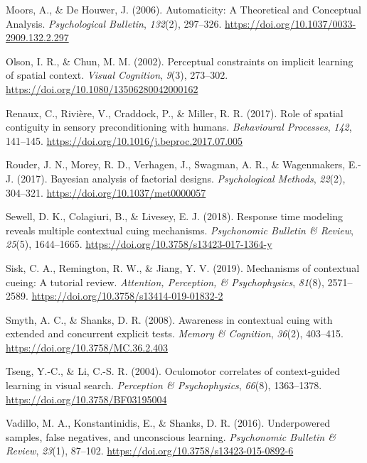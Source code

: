 \documentclass[
  man,
  floatsintext,
  longtable,
  nolmodern,
  notxfonts,
  notimes,
  colorlinks=true,linkcolor=blue,citecolor=blue,urlcolor=blue]{apa7}
\newlength{\cslhangindent}
\newenvironment{CSLReferences}[2] %
 {\begin{list}{}{%
  \setlength{\itemindent}{0pt}
  \setlength{\leftmargin}{0pt}
  \setlength{\parsep}{0pt}
  \ifodd #1
   \setlength{\leftmargin}{\cslhangindent}
   \setlength{\itemindent}{-1\cslhangindent}
  \fi
  \setlength{\itemsep}{#2\baselineskip}}}
 {\end{list}}
\begin{document}
\begin{CSLReferences}{1}{0}
Moors, A., \& De Houwer, J. (2006). Automaticity: {A Theoretical} and
{Conceptual Analysis}. \emph{Psychological Bulletin}, \emph{132}(2),
297--326. \url{https://doi.org/10.1037/0033-2909.132.2.297}

Olson, I. R., \& Chun, M. M. (2002). Perceptual constraints on implicit
learning of spatial context. \emph{Visual Cognition}, \emph{9}(3),
273--302. \url{https://doi.org/10.1080/13506280042000162}

Renaux, C., Rivière, V., Craddock, P., \& Miller, R. R. (2017). Role of
spatial contiguity in sensory preconditioning with humans.
\emph{Behavioural Processes}, \emph{142}, 141--145.
\url{https://doi.org/10.1016/j.beproc.2017.07.005}

Rouder, J. N., Morey, R. D., Verhagen, J., Swagman, A. R., \&
Wagenmakers, E.-J. (2017). Bayesian analysis of factorial designs.
\emph{Psychological Methods}, \emph{22}(2), 304--321.
\url{https://doi.org/10.1037/met0000057}

Sewell, D. K., Colagiuri, B., \& Livesey, E. J. (2018). Response time
modeling reveals multiple contextual cuing mechanisms. \emph{Psychonomic
Bulletin \& Review}, \emph{25}(5), 1644--1665.
\url{https://doi.org/10.3758/s13423-017-1364-y}

Sisk, C. A., Remington, R. W., \& Jiang, Y. V. (2019). Mechanisms of
contextual cueing: {A} tutorial review. \emph{Attention, Perception, \&
Psychophysics}, \emph{81}(8), 2571--2589.
\url{https://doi.org/10.3758/s13414-019-01832-2}

Smyth, A. C., \& Shanks, D. R. (2008). Awareness in contextual cuing
with extended and concurrent explicit tests. \emph{Memory \& Cognition},
\emph{36}(2), 403--415. \url{https://doi.org/10.3758/MC.36.2.403}

Tseng, Y.-C., \& Li, C.-S. R. (2004). Oculomotor correlates of
context-guided learning in visual search. \emph{Perception \&
Psychophysics}, \emph{66}(8), 1363--1378.
\url{https://doi.org/10.3758/BF03195004}

Vadillo, M. A., Konstantinidis, E., \& Shanks, D. R. (2016).
Underpowered samples, false negatives, and unconscious learning.
\emph{Psychonomic Bulletin \& Review}, \emph{23}(1), 87--102.
\url{https://doi.org/10.3758/s13423-015-0892-6}


\end{CSLReferences}
\end{document}
